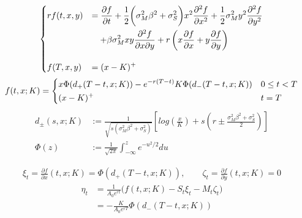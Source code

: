 \documentclass[12pt]{article}
\newenvironment{solution}[2][Solution]{\begin{trivlist}
\item[\hskip \labelsep {\bfseries #1}\hskip \labelsep {\bfseries #2.}]}{\end{trivlist}}
\begin{document}
\begin{solution}[Solution] \\ 
\begin{align*}
\begin{dcases}
    rf(t,x, y) &= \frac{\partial f}{\partial t} + \frac{1}{2}\bigg(\sigma_M^2 \beta^2 +\sigma_S^2\bigg)x^2 \frac{\partial^2 f}{\partial x^2} +\frac{1}{2}\sigma_M^2 y^2 \frac{\partial^2 f}{\partial y^2}  \\
    &\quad+ \beta\sigma_M^2 xy\frac{\partial^2 f}{\partial x \partial y} + r\left( x\frac{\partial f}{\partial x} +y\frac{\partial f}{\partial y} \right)\\[10pt]
    f(T,x,y)&=(x-K)^+
\end{dcases}
\end{align*}
\begin{align*}
    f(t,x;K) = 
    \begin{dcases}
        x\Phi(d_+(T-t,x;K))-e^{-r(T-t)}K\Phi(d_-(T-t,x;K)) &0\leq t < T\\
        (x-K)^+ &t=T
    \end{dcases}
\end{align*}
\begin{align*}
    d_\pm(s,x;K) &:= \frac{1}{\sqrt{s(\sigma_M^2 \beta^2 + \sigma_S^2)}}\left[ log\left(\frac{x}{K}\right)+s \left( r \pm \frac{\sigma_M^2 \beta^2 + \sigma_S^2}{2}\right)\right] \\
    \Phi(z) &:= \frac{1}{\sqrt{2\pi}}\int^z_{-\infty}e^{-u^2/2}du
\end{align*}

\begin{align*}
    \xi_t = \frac{\partial f}{\partial x}(t,x;K) = \Phi(d_+(T-t,x;K)), \qquad \zeta_t =\frac{\partial f}{\partial y}(t,x;K)=0
\end{align*}
\begin{align*}
    \eta_t &= \frac{1}{A_0 e^{rt}} \big(f(t,x;K) - S_t\xi_t - M_t\zeta_t \big)\\
    &= -\frac{K}{A_0e^{rT}}\Phi(d_-(T-t,x;K))
\end{align*}
\end{solution}
\end{document}
